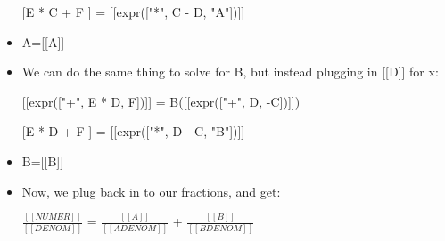 \documentclass{article}
\begin{document}
\begin{itemize}
                    
                        
                            [[expr(["+", E * C, F])]] =
                            A([[expr(["+", C, -D])]])
  \item [[E * C + F]] =
                        [[expr(["*", C - D, "A"])]]
  \item A=[[A]]
  \item We can do the same thing to solve for B,
                        but instead plugging in [[D]] for
                        x:
                    
                    
                        
                            [[expr(["+", E * D, F])]] =
                            B([[expr(["+", D, -C])]])
  \item [[E * D + F]] =
                        [[expr(["*", D - C, "B"])]]
  \item B=[[B]]
  \item Now, we plug back in to our fractions, and get:
                    
                    
                        
                            $\frac{[[NUMER]]}{[[DENOM]]}$ =
                            $\frac{[[A]]}{[[ADENOM]]}$ +
                            $\frac{[[B]]}{[[BDENOM]]}$
\end{itemize}
\end{document}
